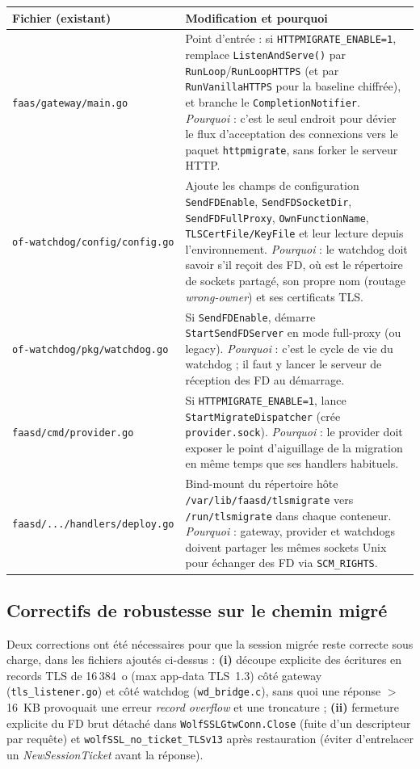 \documentclass[10pt,a4paper]{article}
\newcommand{\code}[1]{\texttt{\small #1}}
\begin{document}
\begin{center}\footnotesize
\begin{tabular}{@{}p{4.2cm} p{12.35cm}@{}}
\toprule
\textbf{Fichier (existant)} & \textbf{Modification et pourquoi} \\
\midrule
\code{faas/gateway/main.go} &
Point d'entrée : si \code{HTTPMIGRATE\_ENABLE=1}, remplace \code{ListenAndServe()} par
\code{RunLoop}/\code{RunLoopHTTPS} (et par \code{RunVanillaHTTPS} pour la baseline chiffrée), et branche
le \code{CompletionNotifier}. \emph{Pourquoi} : c'est le seul endroit pour dévier le flux d'acceptation
des connexions vers le paquet \code{httpmigrate}, sans forker le serveur HTTP. \\
\code{of-watchdog/config/config.go} &
Ajoute les champs de configuration \code{SendFDEnable}, \code{SendFDSocketDir}, \code{SendFDFullProxy},
\code{OwnFunctionName}, \code{TLSCertFile/KeyFile} et leur lecture depuis l'environnement.
\emph{Pourquoi} : le watchdog doit savoir s'il reçoit des FD, où est le répertoire de sockets partagé,
son propre nom (routage \emph{wrong-owner}) et ses certificats TLS. \\
\code{of-watchdog/pkg/watchdog.go} &
Si \code{SendFDEnable}, démarre \code{StartSendFDServer} en mode full-proxy (ou legacy). \emph{Pourquoi} :
c'est le cycle de vie du watchdog ; il faut y lancer le serveur de réception des FD au démarrage. \\
\code{faasd/cmd/provider.go} &
Si \code{HTTPMIGRATE\_ENABLE=1}, lance \code{StartMigrateDispatcher} (crée \code{provider.sock}).
\emph{Pourquoi} : le provider doit exposer le point d'aiguillage de la migration en même temps que ses
handlers habituels. \\
\code{faasd/.../handlers/deploy.go} &
Bind-mount du répertoire hôte \code{/var/lib/faasd/tlsmigrate} vers \code{/run/tlsmigrate} dans chaque
conteneur. \emph{Pourquoi} : gateway, provider et watchdogs doivent partager les mêmes sockets Unix pour
échanger des FD via \code{SCM\_RIGHTS}. \\
\bottomrule
\end{tabular}
\end{center}

\subsection*{Correctifs de robustesse sur le chemin migré}
Deux corrections ont été nécessaires pour que la session migrée reste correcte sous charge, dans les
fichiers ajoutés ci-dessus : \textbf{(i)} découpe explicite des écritures en records TLS de 16\,384~o
(max app-data TLS~1.3) côté gateway (\code{tls\_listener.go}) et côté watchdog (\code{wd\_bridge.c}), sans
quoi une réponse $>$16~KB provoquait une erreur \emph{record overflow} et une troncature ; \textbf{(ii)}
fermeture explicite du FD brut détaché dans \code{WolfSSLGtwConn.Close} (fuite d'un descripteur par
requête) et \code{wolfSSL\_no\_ticket\_TLSv13} après restauration (éviter d'entrelacer un
\emph{NewSessionTicket} avant la réponse).
\end{document}
